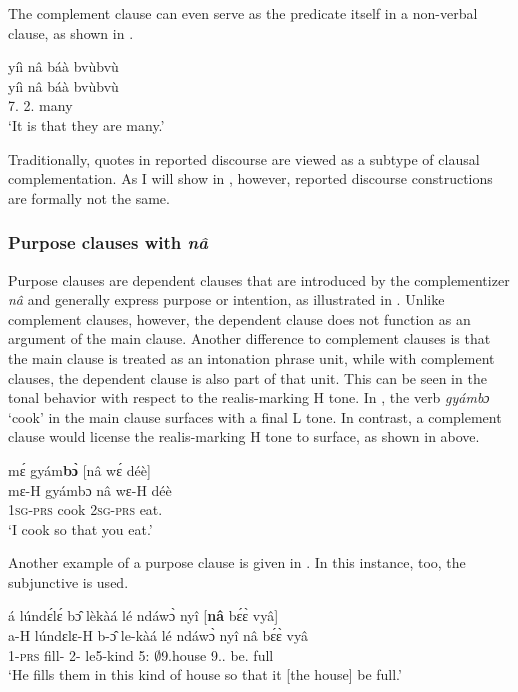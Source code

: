The complement clause can even serve as the predicate itself in a non-verbal clause, as shown in .


\ea\label{nacompyi}
  \glll   yíì nâ báà bvùbvù \\
         yíì nâ báà bvùbvù \\
            7.{\COP} {\COMP} 2.{\COP} many \\
    \trans `It is that they are many.'
\z

Traditionally, quotes in reported discourse are viewed as a subtype of clausal complementation. As I will show in  , however, reported discourse constructions are formally not the same.




\subsubsection{Purpose clauses with {\itshape nâ}}
\label{sec:Purposena}

Purpose clauses are dependent clauses that are introduced by the complementizer {\itshape nâ} and generally express purpose or intention, as illustrated  in . Unlike complement clauses, however, the dependent clause does not function as an argument of the main clause.  Another difference to complement clauses is that the main clause is treated as an intonation phrase unit, while with complement clauses, the dependent clause is also part of that unit. This can be seen in the tonal behavior with respect to the realis-marking H tone. In , the verb {\itshape gyámbɔ} `cook' in the main clause surfaces with a final L tone. In contrast,  a complement clause would license the realis-marking H tone to surface, as shown in  above.


\ea\label{purpna1}
  \glll mɛ́ gyám{\bfseries bɔ̀} [nâ wɛ́ déè]\textsubscript{{\COMP}}\\
        mɛ-H gyámbɔ {\db}nâ wɛ-H déè\\
      1\textsc{sg}-\textsc{prs} cook {\db}{\COMP} 2\textsc{sg}-\textsc{prs} eat.{\SBJV} \\
    \trans `I cook so that you eat.'
\z

Another example of a purpose clause is given in . In this instance, too, the subjunctive is used.


\ea\label{BComp4}
  \glll á lúndɛ́lɛ́ bɔ̂ lèkàá lé ndáwɔ̀ nyî [{\bfseries nâ} bɛ́ɛ̀ vyâ]\textsubscript{{\COMP}} \\
       a-H lúndɛlɛ-H b-ɔ̂ le-kàá lé ndáwɔ̀ nyî {\db}nâ bɛ́ɛ̀ vyâ \\
       1-\textsc{prs} fill-{\R} 2-{\OBJ} le5-kind 5:{\ATT} $\emptyset$9.house 9.{\DEM}.{\PROX} {\db}{\COMP} be.{\SBJV} full \\
    \trans `He fills them in this kind of house so that it [the house] be full.'
\z


